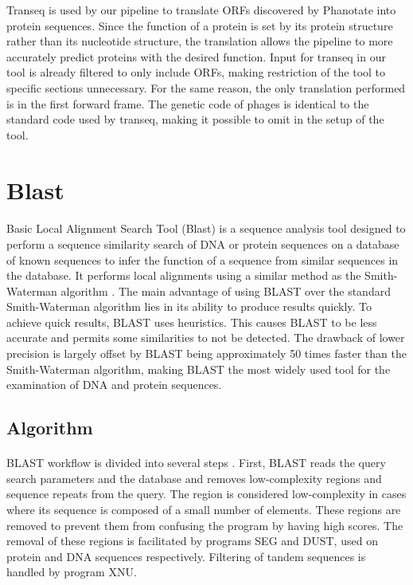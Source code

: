 Transeq is used by our pipeline to translate ORFs discovered by Phanotate into protein sequences. Since the function of a protein is set by its protein structure rather than its nucleotide structure, the translation allows the pipeline to more accurately predict proteins with the desired function. Input for transeq in our tool is already filtered to only include ORFs, making restriction of the tool to specific sections unnecessary. For the same reason, the only translation performed is in the first forward frame. The genetic code of phages is identical to the standard code used by transeq, making it possible to omit in the setup of the tool.

\section{Blast}
\paragraph*{}
Basic Local Alignment Search Tool (Blast)\cite{altschul1990basic} is a sequence analysis tool designed to perform a sequence similarity search of DNA or protein sequences on a database of known sequences to infer the function of a sequence from similar sequences in the database. It performs local alignments using a similar method as the Smith-Waterman algorithm \cite{smith1981identification}. The main advantage of using BLAST over the standard Smith-Waterman algorithm lies in its ability to produce results quickly. To achieve quick results, BLAST uses heuristics. This causes BLAST to be less accurate and permits some similarities to not be detected. The drawback of lower precision is largely offset by BLAST being approximately 50 times faster than the Smith-Waterman algorithm, making BLAST the most widely used tool for the examination of DNA and protein sequences.
\subsection{Algorithm}
\paragraph*{}
BLAST workflow is divided into several steps \cite{gollery2005bioinformatics}. First, BLAST reads the query search parameters and the database and removes low-complexity regions and sequence repeats from the query. The region is considered low-complexity in cases where its sequence is composed of a small number of elements. These regions are removed to prevent them from confusing the program by having high scores. The removal of these regions is facilitated by programs SEG and DUST, used on protein and DNA sequences respectively. Filtering of tandem sequences is handled by program XNU. 

